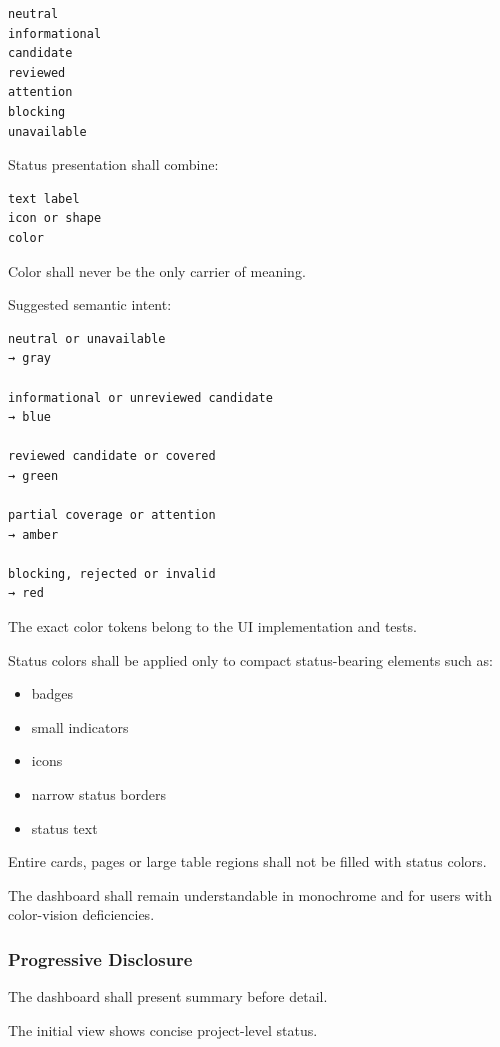 \begin{verbatim}
neutral
informational
candidate
reviewed
attention
blocking
unavailable
\end{verbatim}

Status presentation shall combine:

\begin{verbatim}
text label
icon or shape
color
\end{verbatim}

Color shall never be the only carrier of meaning.

Suggested semantic intent:

\begin{verbatim}
neutral or unavailable
→ gray

informational or unreviewed candidate
→ blue

reviewed candidate or covered
→ green

partial coverage or attention
→ amber

blocking, rejected or invalid
→ red
\end{verbatim}

The exact color tokens belong to the UI implementation and tests.

Status colors shall be applied only to compact status-bearing elements such as:

\begin{itemize}
\tightlist
\item
  badges
\item
  small indicators
\item
  icons
\item
  narrow status borders
\item
  status text
\end{itemize}

Entire cards, pages or large table regions shall not be filled with status colors.

The dashboard shall remain understandable in monochrome and for users with color-vision deficiencies.

\hypertarget{progressive-disclosure}{%
\subsubsection{Progressive Disclosure}\label{progressive-disclosure}}

The dashboard shall present summary before detail.

The initial view shows concise project-level status.

